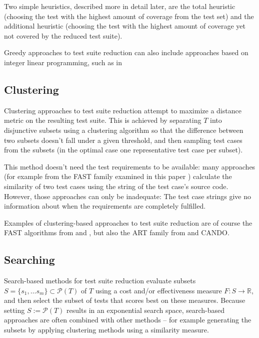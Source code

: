 Two simple heuristics, described more in detail later, are the total
heuristic (choosing the test with the highest amount of coverage from
the test set) and the additional heuristic (choosing the test with the
highest amount of coverage yet not covered by the reduced test suite).

Greedy approaches to test suite reduction can also include approaches
based on integer linear programming, such as in %


\subsection{Clustering}

Clustering approaches to test suite reduction attempt to maximize
a distance metric on the resulting test suite. This is achieved by
separating $T$ into disjunctive subsets using a clustering algorithm
so that the difference between two subsets doesn't fall under a given %
threshold, and then sampling test cases from the subsets (in the optimal
case one representative test case per subset).

This method doesn't need the test requirements to be available: many
approaches (for example from the FAST family examined in this paper
\cite{miranda2018fast}) calculate the similarity of two test cases using
the string of the test case's source code. However, those approaches can
only be inadequate: The test case strings give no information about when
the requirements are completely fulfilled.

Examples of clustering-based approaches to test suite reduction are
of course the FAST algorithms from \cite{cruciani2019scalable}
and \cite{miranda2018fast}, but also the ART family from
\cite{chen2010adaptive} and CANDO.


\subsection{Searching}

Search-based methods for test suite reduction evaluate subsets
$S=\{s_1, \dots s_m\} \subset \mathcal{P}(T)$ of $T$ using a cost
and/or effectiveness measure $F: S \rightarrow \mathbb{R}$, and then
select the subset of tests that scores best on these measures. Because
setting $S:=\mathcal{P}(T)$ results in an exponential search space,
search-based approaches are often combined with other methods – for
example generating the subsets by applying clustering methods using a
similarity measure.

